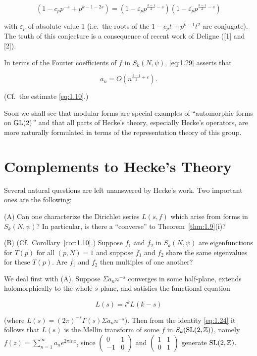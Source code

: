 \[
(1 - c_p p^{-s} + p^{k-1-2s}) = (1 - \varepsilon_p p^{\frac{k-1}{2} - s})\left(1 - \overline{\varepsilon_p} p^{\frac{k-1}{2} - s}\right)
\]

with $\varepsilon_p$ of absolute value 1 (i.e.\ the roots of the $1 - c_p t + p^{k-1} t^2$ are conjugate). The truth of this conjecture is a consequence of recent work of Deligne ([1] and [2]).

In terms of the Fourier coefficients of $f$ in $S_k(N,\psi)$, \eqref{eq:1.29} asserts that

\[
a_n = O\!\left(n^{\frac{k-1}{2} + \varepsilon}\right).
\]

(Cf.\ the estimate \eqref{eq:1.10}.)

Soon we shall see that modular forms are special examples of ``automorphic forms on $\operatorname{GL}(2)$'' and that all parts of Hecke's theory, especially Hecke's operators, are more naturally formulated in terms of the representation theory of this group.

\section{Complements to Hecke's Theory}\label{sec:1d}

Several natural questions are left unanswered by Hecke's work. Two important ones are the following:

(A) Can one characterize the Dirichlet series $L(s,f)$ which arise from forms in $S_k(N,\psi)$? In particular, is there a ``converse'' to Theorem~\ref{thm:1.9}(i)?

(B) (Cf.\ Corollary~\ref{cor:1.10}.) Suppose $f_1$ and $f_2$ in $S_k(N,\psi)$ are eigenfunctions for $T(p)$ for all $(p,N) = 1$ and suppose $f_1$ and $f_2$ share the same eigenvalues for these $T(p)$. Are $f_1$ and $f_2$ then multiples of one another?

We deal first with (A). Suppose $\Sigma a_n n^{-s}$ converges in some half-plane, extends holomorphically to the whole $s$-plane, and satisfies the functional equation

\begin{equation}\label{eq:1.30}
L(s) = i^k L(k - s)\tag{1.30}
\end{equation}

(where $L(s) = (2\pi)^{-s}\Gamma(s)\Sigma a_n n^{-s}$). Then from the identity \eqref{eq:1.24} it follows that $L(s)$ is the Mellin transform of some $f$ in $S_k(\operatorname{SL}(2,\mathbb{Z}))$, namely $f(z) = \sum_{n=1}^{\infty} a_n e^{2\pi inz}$, since $\begin{pmatrix} 0 & 1 \\ -1 & 0 \end{pmatrix}$ and $\begin{pmatrix} 1 & 1 \\ 0 & 1 \end{pmatrix}$ generate $\operatorname{SL}(2,\mathbb{Z})$.

